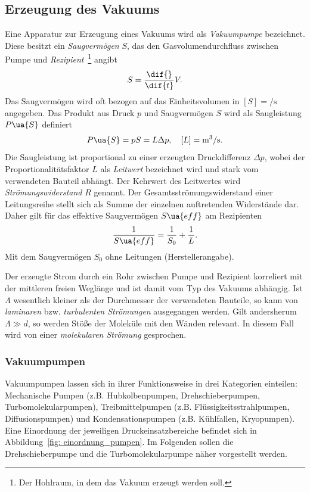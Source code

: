 \subsection{Erzeugung des Vakuums}
Eine Apparatur zur Erzeugung eines Vakuums wird als \emph{Vakuumpumpe} bezeichnet. Diese besitzt ein
\emph{Saugvermögen} $S$, das den Gasvolumendurchfluss zwischen Pumpe und
\emph{Rezipient}~\footnote{Der Hohlraum, in dem das Vakuum erzeugt werden soll.}
angibt
\begin{equation}
  S = \frac{\dif{}}{\dif{t}} V.
\end{equation}
Das Saugvermögen wird oft bezogen auf das Einheitsvolumen in $[{S}] = \si{\per \second}$ angegeben.
Das Produkt aus Druck $p$ und Saugvermögen $S$ wird als Saugleistung $P\ua{S}$ definiert
\begin{equation}
  P\ua{S} = p S = L \Delta p , \quad [L] = \si{\meter^3 \per \second}.
\end{equation}
Die Saugleistung ist proportional zu einer erzeugten Druckdifferenz $\Delta p$,
wobei der Proportionalitätsfaktor $L$ als \emph{Leitwert} bezeichnet wird und stark vom verwendeten Bauteil abhängt.
Der Kehrwert des Leitwertes wird \emph{Strömungswiderstand} $R$ genannt. Der Gesamtsströmungswiderstand einer Leitungsreihe
stellt sich als Summe der einzelnen auftretenden Widerstände dar.
Daher gilt für das effektive Saugvermögen $S\ua{eff}$ am Rezipienten
\begin{equation}
 \frac{1}{S\ua{eff}} = \frac{1}{S_0} + \frac{1}{L}.
 \label{eq: effektives_saugvermögen}
\end{equation}
Mit dem Saugvermögen $S_0$ ohne Leitungen (Herstellerangabe).

Der erzeugte Strom durch ein Rohr zwischen Pumpe und Rezipient korreliert mit der mittleren freien Weglänge
und ist damit vom Typ des Vakuums abhängig. Ist $\Lambda$ wesentlich
kleiner als der Durchmesser der verwendeten Bauteile, so kann von \emph{laminaren} bzw. \emph{turbulenten Strömungen}
ausgegangen werden. Gilt andersherum
$\Lambda \gg d$, so werden Stöße der Moleküle mit den Wänden relevant.
In diesem Fall wird von einer \emph{molekularen Strömung} gesprochen.

\subsubsection{Vakuumpumpen}
Vakuumpumpen lassen sich in ihrer Funktionsweise in drei Kategorien einteilen: Mechanische Pumpen (z.B. Hubkolbenpumpen,
Drehschieberpumpen, Turbomolekularpumpen), Treibmittelpumpen (z.B. Flüssigkeitsstrahlpumpen, Diffusionspumpen) und
Kondensationspumpen (z.B. Kühlfallen, Kryopumpen). Eine Einordnung der jeweiligen Druckeinsatzbereiche befindet sich in
Abbildung~\ref{fig: einordnung_pumpen}. Im Folgenden sollen die Drehschieberpumpe und die Turbomolekularpumpe
näher vorgestellt werden.

